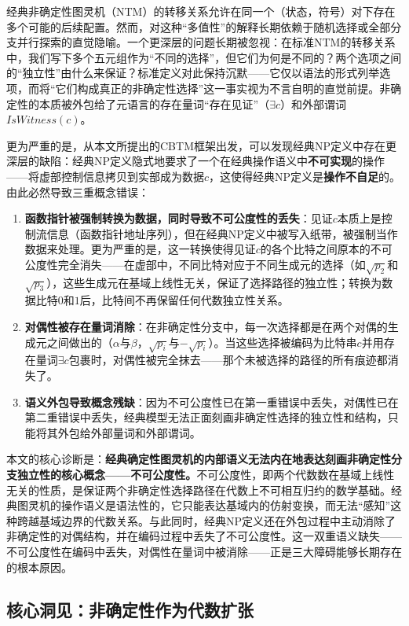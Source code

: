 \documentclass{ctexart}
\begin{document}
	经典非确定性图灵机（NTM）的转移关系允许在同一个（状态，符号）对下存在多个可能的后续配置。然而，对这种``多值性''的解释长期依赖于随机选择或全部分支并行探索的直觉隐喻。一个更深层的问题长期被忽视：在标准NTM的转移关系中，我们写下多个五元组作为``不同的选择''，但它们为何是不同的？两个选项之间的``独立性''由什么来保证？标准定义对此保持沉默——它仅以语法的形式列举选项，而将``它们构成真正的非确定性选择''这一事实视为不言自明的直觉前提。非确定性的本质被外包给了元语言的存在量词``存在见证''（$\exists c$）和外部谓词$IsWitness(c)$。
	
	更为严重的是，从本文所提出的CBTM框架出发，可以发现经典NP定义中存在更深层的缺陷：经典NP定义隐式地要求了一个在经典操作语义中\textbf{不可实现}的操作——将虚部控制信息拷贝到实部成为数据$c$，这使得经典NP定义是\textbf{操作不自足}的。由此必然导致三重概念错误：
	\begin{enumerate}
		\item \textbf{函数指针被强制转换为数据，同时导致不可公度性的丢失}：见证$c$本质上是控制流信息（函数指针地址序列），但在经典NP定义中被写入纸带，被强制当作数据来处理。更为严重的是，这一转换使得见证$c$的各个比特之间原本的不可公度性完全消失——在虚部中，不同比特对应于不同生成元的选择（如$\sqrt{p_2}$和$\sqrt{p_3}$），这些生成元在基域上线性无关，保证了选择路径的独立性；转换为数据比特$0$和$1$后，比特间不再保留任何代数独立性关系。
		\item \textbf{对偶性被存在量词消除}：在非确定性分支中，每一次选择都是在两个对偶的生成元之间做出的（$\alpha$与$\beta$，$\sqrt{p_i}$与$-\sqrt{p_i}$）。当这些选择被编码为比特串$c$并用存在量词$\exists c$包裹时，对偶性被完全抹去——那个未被选择的路径的所有痕迹都消失了。
		\item \textbf{语义外包导致概念残缺}：因为不可公度性已在第一重错误中丢失，对偶性已在第二重错误中丢失，经典模型无法正面刻画非确定性选择的独立性和结构，只能将其外包给外部量词和外部谓词。
	\end{enumerate}
	
	本文的核心诊断是：\textbf{经典确定性图灵机的内部语义无法内在地表达刻画非确定性分支独立性的核心概念——不可公度性。}不可公度性，即两个代数数在基域上线性无关的性质，是保证两个非确定性选择路径在代数上不可相互归约的数学基础。经典图灵机的操作语义是语法性的，它只能表达基域内的仿射变换，而无法``感知''这种跨越基域边界的代数关系。与此同时，经典NP定义还在外包过程中主动消除了非确定性的对偶结构，并在编码过程中丢失了不可公度性。这一双重语义缺失——不可公度性在编码中丢失，对偶性在量词中被消除——正是三大障碍能够长期存在的根本原因。
	
	\subsection{核心洞见：非确定性作为代数扩张}
	
\end{document}
